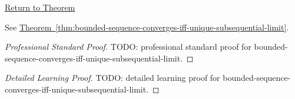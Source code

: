 \newpage
{}
\label{prf:bounded-sequence-converges-iff-unique-subsequential-limit}

\begin{remark*}[Return]
\hyperref[thm:bounded-sequence-converges-iff-unique-subsequential-limit]{Return to Theorem}
\end{remark*}

\begin{theorem*}
See \hyperref[thm:bounded-sequence-converges-iff-unique-subsequential-limit]{Theorem~\ref*{thm:bounded-sequence-converges-iff-unique-subsequential-limit}}.
\end{theorem*}

\begin{proof}[Professional Standard Proof]
\LRAProofBodyStart
TODO: professional standard proof for bounded-sequence-converges-iff-unique-subsequential-limit.
\end{proof}

\begin{proof}[Detailed Learning Proof]
\LRAProofBodyStart
TODO: detailed learning proof for bounded-sequence-converges-iff-unique-subsequential-limit.
\end{proof}

\begin{remark*}
\end{remark*}

\begin{dependencies}
\NoLocalDependencies
\end{dependencies}

\clearpage
